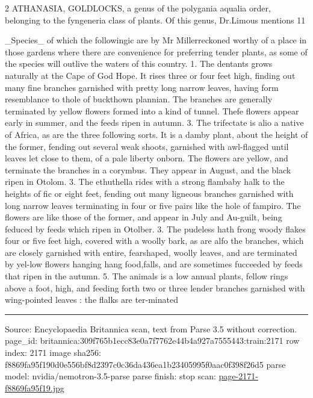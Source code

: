 \documentclass[10pt]{article}
\begin{document}
\begin{multicols}{2}
ATHANASIA, GOLDLOCKS, a genus of the polygania aqualia order, belonging to the fyngeneria class of plants. Of this genus, Dr.Limous mentions 11

\_Species\_ of which the followingic are by Mr Millerreckoned worthy of a place in those gardens where there are convenience for preferring tender plants, as some of the species will outlive the waters of this country. 1. The dentants grows naturally at the Cape of God Hope. It rises three or four feet high, finding out many fine branches garnished with pretty long narrow leaves, having form resemblance to thole of buckthown plannian. The branches are generally terminated by yellow flowers formed into a kind of tunnel. Thefe flowers appear early in summer, and the feeds ripen in autumn. 3. The trifectate is alio a native of Africa, as are the three following sorts. It is a damby plant, about the height of the former, fending out several weak shoots, garnished with awl-flagged until leaves let close to them, of a pale liberty onborn. The flowers are yellow, and terminate the branches in a corymbus. They appear in August, and the black ripen in Otolom. 3. The ethuthella rides with a strong flambaby halk to the heights of fic or eight feet, fending out many ligneous branches garnished with long narrow leaves terminating in four or five pairs like the hole of fampiro. The flowers are like those of the former, and appear in July and Au-guilt, being feduced by feeds which ripen in Otolber. 3. The pudeless hath frong woody flakes four or five feet high, covered with a woolly bark, as are alfo the branches, which are closely garnished with entire, fearshaped, woolly leaves, and are terminated by yel-low flowers hanging hang food,falls, and are sometimes fucceeded by feeds that ripen in the autumn. 5. The animals is a low annual plants, fellow rings above a foot, high, and feeding forth two or three lender branches garnished with wing-pointed leaves : the flalks are ter-minated

\end{multicols}
\vfill\par\noindent\rule{\linewidth}{0.4pt}\par
{\scriptsize\color{gray}\noindent Source: Encyclopaedia Britannica scan, text from Parse 3.5 without correction. page\_id: britannica:309f765b1ecc83e0a7f7762e44b4a927a7555443:train:2171 \quad row index: 2171 \quad image sha256: f8869fa95f190d0e556bf8d2397c0c36da436ea1b23405995f0aac0f398f26d5 \quad parse model: nvidia/nemotron-3.5-parse \quad parse finish: stop \quad scan: \href{../scans/page-2171-f8869fa95f19.jpg}{page-2171-f8869fa95f19.jpg}\par}
\end{document}
